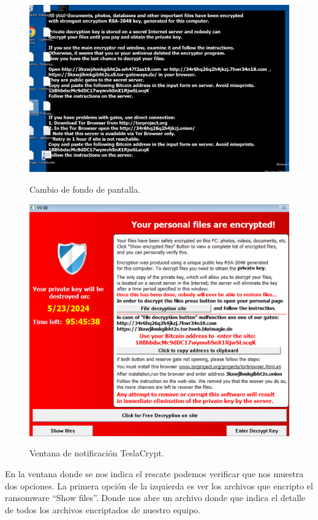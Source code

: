 \documentclass[stu, 11pt, letterpaper, donotrepeattitle, floatsintext, natbib]{apa7}
\begin{document}
\begin{figure}[H]
    \centering
    \caption{Cambio de fondo de pantalla.}
    \includegraphics[width=0.75\linewidth]{ram10.png} %
    \label{fig:OverallEffect}
\end{figure}

\begin{figure}[H]
    \centering
    \caption{Ventana de notificación TeslaCrypt.}
    \includegraphics[width=0.75\linewidth]{ram11.png} %
    \label{fig:OverallEffect}
\end{figure}

En la ventana donde se nos indica el rescate podemos verificar que nos muestra dos opciones. La primera opción de la izquierda es ver los archivos que encripto el ransomware “Show files”. Donde nos abre un archivo donde que indica el detalle de todos los archivos encriptados de nuestro equipo.
\end{document}
